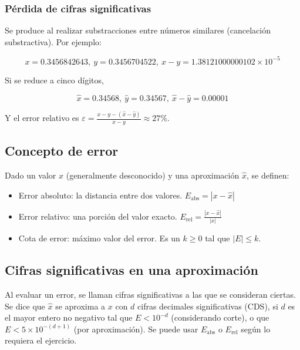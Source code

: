 \documentclass{article}
\begin{document}
\subsubsection{Pérdida de cifras significativas}

Se produce al realizar substracciones entre números similares (cancelación
substractiva). Por ejemplo: 

\begin{equation*}
    x = 0.3456842643,\ y = 0.3456704522,\ x - y = 1.38121000000102\times10^{-5}
\end{equation*}

Si se reduce a cinco dígitos,

\begin{equation*}
    \hat{x} = 0.34568,\ \hat{y} = 0.34567,\ \hat{x} - \hat{y} = 0.00001
\end{equation*}

Y el error relativo es 
$\varepsilon = \frac{x - y - (\hat{x} - \hat{y})}{x-y}\approx27\%$.

\subsection{Concepto de error}

Dado un valor $x$ (generalmente desconocido) y una aproximación $\hat{x}$, se 
definen:

\begin{itemize}
    \item Error absoluto: la distancia entre dos valores.
        $E_{\text{abs}} = |x-\hat{x}|$
    \item Error relativo: una porción del valor exacto.
        $E_{\text{rel}} = \frac{|x-\hat{x}|}{|x|}$
    \item Cota de error: máximo valor del error. Es un $k\geq0$ tal que 
        $|E|\leq k$.
\end{itemize}

\subsection{Cifras significativas en una aproximación}

Al evaluar un error, se llaman cifras significativas a las que se consideran
ciertas. Se dice que $\hat{x}$ se aproxima a $x$ con $d$ cifras decimales
significativas (CDS), si $d$ es el mayor entero no negativo tal que 
$E<10^{-d}$ (considerando corte), o que $E<5\times10^{-(d+1)}$ (por 
aproximación). Se puede usar $E_{\text{abs}}$ o $E_{\text{rel}}$ según lo 
requiera el ejercicio.
\end{document}

